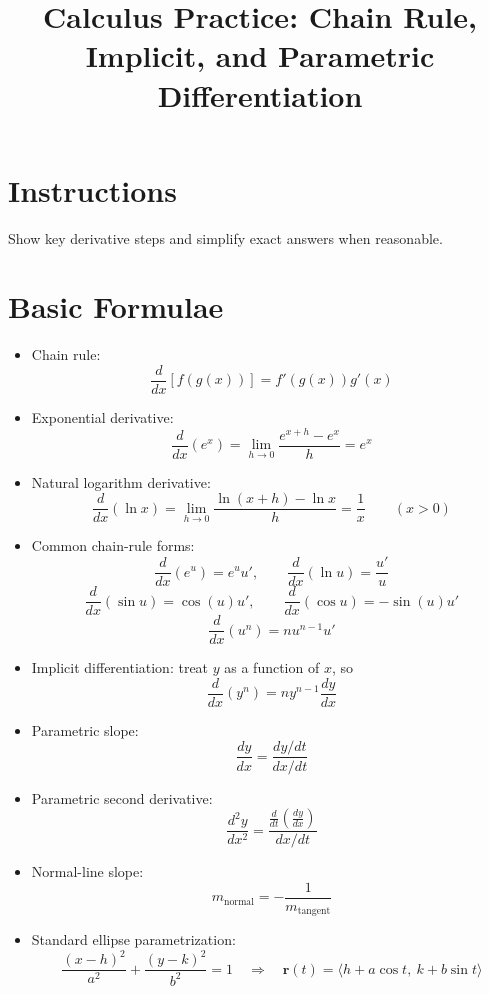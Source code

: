 \documentclass[12pt]{article}
\title{Calculus Practice: Chain Rule, Implicit, and Parametric Differentiation}
\author{}
\date{}
\begin{document}
\maketitle

\section*{Instructions}
Show key derivative steps and simplify exact answers when reasonable.

\section*{Basic Formulae}
\begin{itemize}[leftmargin=1.5em]
  \item Chain rule:
  \[
  \frac{d}{dx}[f(g(x))]=f'(g(x))g'(x)
  \]
  \item Exponential derivative:
  \[
  \frac{d}{dx}\left(e^x\right)
  =\lim_{h\to 0}\frac{e^{x+h}-e^x}{h}
  =e^x
  \]
  \item Natural logarithm derivative:
  \[
  \frac{d}{dx}\left(\ln x\right)
  =\lim_{h\to 0}\frac{\ln(x+h)-\ln x}{h}
  =\frac{1}{x}\qquad (x>0)
  \]
  \item Common chain-rule forms:
  \[
  \frac{d}{dx}\left(e^{u}\right)=e^u u',\qquad
  \frac{d}{dx}\left(\ln u\right)=\frac{u'}{u}
  \]
  \[
  \frac{d}{dx}\left(\sin u\right)=\cos(u)u',\qquad
  \frac{d}{dx}\left(\cos u\right)=-\sin(u)u'
  \]
  \[
  \frac{d}{dx}\left(u^n\right)=nu^{n-1}u'
  \]
  \item Implicit differentiation: treat $y$ as a function of $x$, so
  \[
  \frac{d}{dx}(y^n)=ny^{n-1}\frac{dy}{dx}
  \]
  \item Parametric slope:
  \[
  \frac{dy}{dx}=\frac{dy/dt}{dx/dt}
  \]
  \item Parametric second derivative:
  \[
  \frac{d^2y}{dx^2}=\frac{\frac{d}{dt}\left(\frac{dy}{dx}\right)}{dx/dt}
  \]
  \item Normal-line slope:
  \[
  m_{\text{normal}}=-\frac{1}{m_{\text{tangent}}}
  \]
  \item Standard ellipse parametrization:
  \[
  \frac{(x-h)^2}{a^2}+\frac{(y-k)^2}{b^2}=1
  \quad\Longrightarrow\quad
  \mathbf{r}(t)=\langle h+a\cos t,\ k+b\sin t\rangle
  \]
\end{itemize}
\end{document}
